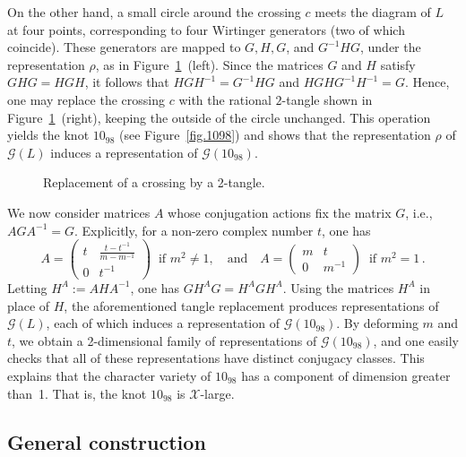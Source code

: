 \documentclass[12pt,reqno]{amsart}
\theoremstyle{definition}
\def\calG{\mathcal G}
\def\calX{\mathcal X}
\begin{document}
On the other hand, a small circle around the crossing $c$ meets the diagram of $L$ at four points, corresponding to four Wirtinger generators (two of which coincide).
These generators are mapped to $G,H,G$, and $G^{-1}HG$, under the representation $\rho$, as in Figure~\ref{fig.trefoil}~(left).
Since the matrices $G$ and $H$ satisfy $GHG=HGH$, it follows that $HGH^{-1}=G^{-1}HG$ and $HGHG^{-1}H^{-1}=G$. Hence, one may replace the crossing $c$ with the rational $2$-tangle shown in Figure~\ref{fig.trefoil}~(right), keeping the outside of the circle unchanged. This operation yields the knot $10_{98}$ (see Figure~\ref{fig.1098}) and shows that the representation $\rho$ of $\calG(L)$ induces a representation of $\calG(10_{98})$.

\begin{figure}[!htbp]
    \centering
    
    \caption{Replacement of a crossing by a 2-tangle.}
    \label{fig.trefoil}
\end{figure}


We now consider matrices $A$ whose conjugation actions fix the matrix $G$, i.e., $AGA^{-1}=G$. 
Explicitly, for a non-zero complex number $t$, one has
\begin{equation}
\label{eqn.A}
A= \begin{pmatrix}
 t & \frac{t-t^{-1}}{m-m^{-1}} \\
 0 & t^{-1}
    \end{pmatrix} \ \text{ if } m^2 \neq 1, \quad \text{and} \quad 
    A= \begin{pmatrix}
 m & t \\
 0 & m^{-1}
    \end{pmatrix} \ \text{ if } m^2 = 1 \,.
\end{equation}
Letting $H^A:=AHA^{-1}$, one has $GH^AG = H^AGH^A$.
Using the matrices $H^A$ in place of $H$, the aforementioned tangle replacement  produces representations of $\calG(L)$, each of which induces a  representation of $\calG(10_{98})$. 
By deforming $m$ and $t$, we obtain a 2-dimensional family of representations of $\calG(10_{98})$, and one easily checks that all of these representations have distinct conjugacy classes. This explains that the character variety of $10_{98}$ has a component of dimension greater than~1. That is, the knot $10_{98}$ is $\calX$-large.


\subsection{General construction} 
\label{sec.generalization}
\end{document}

